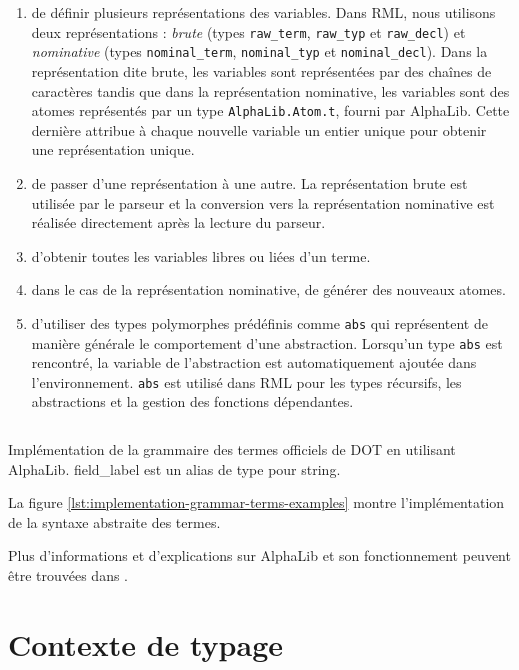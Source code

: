 \begin{enumerate}
  \item de définir plusieurs représentations des variables. Dans RML, nous utilisons deux
  représentations : \textit{brute} (types \verb|raw_term|,
  \verb|raw_typ| et \verb|raw_decl|) et \textit{nominative}
  (types \verb|nominal_term|, \verb|nominal_typ| et \verb|nominal_decl|). Dans la
  représentation dite brute, les variables sont représentées par des chaînes de
  caractères tandis que dans la représentation nominative, les variables sont
  des atomes représentés par un type \verb|AlphaLib.Atom.t|, fourni par
  AlphaLib. Cette dernière attribue à chaque nouvelle variable un entier
  unique pour obtenir une représentation unique.
\item de passer d'une représentation à une autre. La représentation brute est
  utilisée par le parseur et la conversion vers la représentation nominative est
  réalisée directement après la lecture du parseur.
\item d'obtenir toutes les variables libres ou liées d'un terme.
\item dans le cas de la représentation nominative, de générer des nouveaux atomes.
\item d'utiliser des types polymorphes prédéfinis comme \verb|abs| qui représentent de manière générale
  le comportement d'une abstraction. Lorsqu'un type \verb|abs|
  est rencontré, la variable de l'abstraction est automatiquement ajoutée dans
  l'environnement. \verb|abs| est utilisé dans RML pour les types récursifs,
  les abstractions et la gestion des fonctions dépendantes.
\end{enumerate}

\begin{listing}
  \inputminted{OCaml}{codes/grammar.ml}
  \caption{Implémentation de la grammaire des termes officiels de DOT en
    utilisant AlphaLib. field\_label est un alias de type pour string.}
  \label{lst:implementation-grammar-terms-examples}
\end{listing}

La figure \ref{lst:implementation-grammar-terms-examples} montre l'implémentation
de la syntaxe abstraite des termes.

Plus d'informations et d'explications sur AlphaLib et son fonctionnement peuvent
être trouvées dans \cite{alphalib-paper}.

\section{Contexte de typage}

